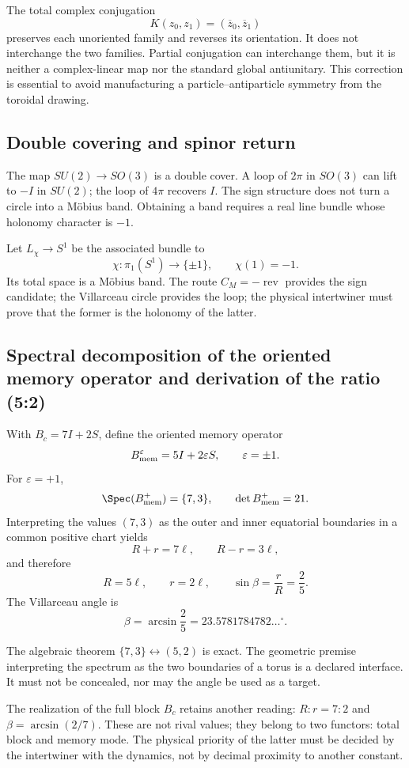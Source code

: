 The total complex conjugation
\[
K(z_0,z_1)=(\overline z_0,\overline z_1)
\]
preserves each unoriented family and reverses its orientation. It does not interchange
the two families. Partial conjugation can interchange them, but it is neither a
complex-linear map nor the standard global antiunitary. This correction
is essential to avoid manufacturing a particle--antiparticle symmetry from the
toroidal drawing.

\subsection{Double covering and spinor return}

The map \(SU(2)\to SO(3)\) is a double cover. A loop of
\(2\pi\) in \(SO(3)\) can lift to \(-I\) in \(SU(2)\); the loop of
\(4\pi\) recovers \(I\). The sign structure does not turn a circle into a
Möbius band. Obtaining a band requires a real line bundle
whose holonomy character is \(-1\).

Let \(L_\chi\to S^1\) be the associated bundle to
\[
\chi:\pi_1(S^1)\longrightarrow\{\pm1\},
\qquad \chi(1)=-1.
\]
Its total space is a Möbius band. The route \(C_M=-\operatorname{rev}\)
provides the sign candidate; the Villarceau circle provides the loop; the
physical intertwiner must prove that the former is the holonomy of the latter.

\subsection{Spectral decomposition of the oriented memory operator and derivation of the ratio (5{:}2)}

With \(B_c=7I+2S\), define the oriented memory operator
\[
B_{\rm mem}^{\varepsilon}=5I+2\varepsilon S,
\qquad\varepsilon=\pm1.
\]
For \(\varepsilon=+1\),
\[
\Spec(B_{\rm mem}^{+})=\{7,3\},
\qquad\det B_{\rm mem}^{+}=21.
\]
Interpreting the values \((7,3)\) as the outer and inner equatorial boundaries
in a common positive chart yields
\[
R+r=7\ell,\qquad R-r=3\ell,
\]
and therefore
\[
R=5\ell,\qquad r=2\ell,\qquad
\sin\beta=\frac rR=\frac25.
\]
The Villarceau angle is
\[
\beta=\arcsin\frac25
=23.5781784782\ldots^\circ.
\]

The algebraic theorem \(\{7,3\}\leftrightarrow(5,2)\) is exact. The geometric
premise interpreting the spectrum as the two boundaries of a torus is a
declared interface. It must not be concealed, nor may the angle be used as a target.

The realization of the full block \(B_c\) retains another reading:
\(R:r=7:2\) and \(\beta=\arcsin(2/7)\). These are not rival values; they belong to
two functors: total block and memory mode. The physical priority of the latter
must be decided by the intertwiner with the dynamics, not by decimal proximity to
another constant.

